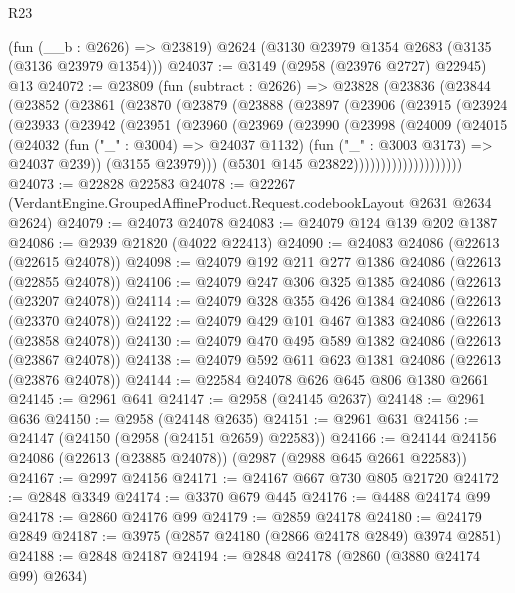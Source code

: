 \begin{lexlean}{R23}
\begin{coremodule}
    (fun (__b : @2626) => @23819)
    @2624
    (@3130 @23979 @1354 @2683 (@3135 (@3136 @23979 @1354)))
@24037 := @3149 (@2958 (@23976 @2727) @22945) @13
@24072 := @23809
    (fun (subtract : @2626) =>
    @23828
      (@23836
        (@23844
          (@23852
            (@23861
              (@23870
                (@23879
                  (@23888
                    (@23897
                      (@23906
                        (@23915
                          (@23924
                            (@23933
                              (@23942
                                (@23951
                                  (@23960
                                    (@23969
                                      (@23990
                                        (@23998
                                          (@24009
                                            (@24015
                                              (@24032
                                                (fun ("_" : @3004) => @24037 @1132)
                                                (fun ("_" : @3003 @3173) => @24037 @239))
                                              (@3155 @23979)))
                                          (@5301 @145 @23822))))))))))))))))))))
@24073 := @22828 @22583
@24078 := @22267 (VerdantEngine.GroupedAffineProduct.Request.codebookLayout @2631 @2634 @2624)
@24079 := @24073 @24078
@24083 := @24079 @124 @139 @202 @1387
@24086 := @2939 @21820 (@4022 @22413)
@24090 := @24083 @24086 (@22613 (@22615 @24078))
@24098 := @24079 @192 @211 @277 @1386 @24086 (@22613 (@22855 @24078))
@24106 := @24079 @247 @306 @325 @1385 @24086 (@22613 (@23207 @24078))
@24114 := @24079 @328 @355 @426 @1384 @24086 (@22613 (@23370 @24078))
@24122 := @24079 @429 @101 @467 @1383 @24086 (@22613 (@23858 @24078))
@24130 := @24079 @470 @495 @589 @1382 @24086 (@22613 (@23867 @24078))
@24138 := @24079 @592 @611 @623 @1381 @24086 (@22613 (@23876 @24078))
@24144 := @22584 @24078 @626 @645 @806 @1380 @2661
@24145 := @2961 @641
@24147 := @2958 (@24145 @2637)
@24148 := @2961 @636
@24150 := @2958 (@24148 @2635)
@24151 := @2961 @631
@24156 := @24147 (@24150 (@2958 (@24151 @2659) @22583))
@24166 := @24144 @24156 @24086 (@22613 (@23885 @24078)) (@2987 (@2988 @645 @2661 @22583))
@24167 := @2997 @24156
@24171 := @24167 @667 @730 @805 @21720
@24172 := @2848 @3349
@24174 := @3370 @679 @445
@24176 := @4488 @24174 @99
@24178 := @2860 @24176 @99
@24179 := @2859 @24178
@24180 := @24179 @2849
@24187 := @3975 (@2857 @24180 (@2866 @24178 @2849) @3974 @2851)
@24188 := @2848 @24187
@24194 := @2848 @24178 (@2860 (@3880 @24174 @99) @2634)

\end{coremodule}
\end{lexlean}
